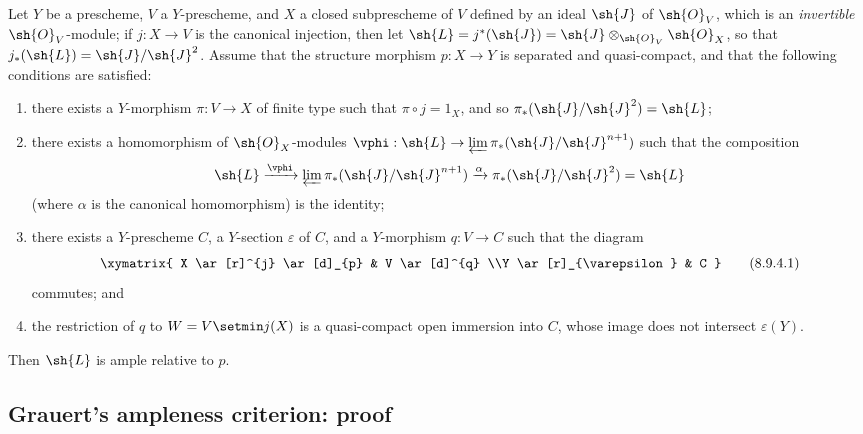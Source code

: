 \begin{proposition}[8.9.4]
\label{II.8.9.4}
Let $Y$ be a prescheme, $V$ a $Y$-prescheme, and $X$ a closed subprescheme of $V$ defined by an ideal $\sh{J}$ of $\sh{O}_V$, which is an \emph{invertible} $\sh{O}_V$-module;
if $j:X\to V$ is
the canonical injection, then let $\sh{L} = j^*(\sh{J}) = \sh{J}\otimes_{\sh{O}_V}\sh{O}_X$, so that $j_*(\sh{L})=\sh{J}/\sh{J}^2$.
Assume that the structure morphism $p:X\to Y$ is separated and quasi-compact, and that the following conditions are satisfied:
\begin{enumerate}
  \item[\rm{(i)}] there exists a $Y$-morphism $\pi:V\to X$ of finite type such that $\pi\circ j=1_X$, and so $\pi_*(\sh{J}/\sh{J}^2)=\sh{L}$;
  \item[\rm{(ii)}] there exists a homomorphism of $\sh{O}_X$-modules $\vphi:\sh{L}\to\varprojlim\pi_*(\sh{J}/\sh{J}^{n+1})$ such that the composition
    \[
      \sh{L}
      \xrightarrow{\vphi}
      \varprojlim \pi_*(\sh{J}/\sh{J}^{n+1})
      \xrightarrow{\alpha}
      \pi_*(\sh{J}/\sh{J}^2) = \sh{L}
    \]
    (where $\alpha$ is the canonical homomorphism) is the identity;
  \item[\rm{(iii)}] there exists a $Y$-prescheme $C$, a $Y$-section $\varepsilon$ of $C$, and a $Y$-morphism $q:V\to C$ such that the diagram
    \[
    \label{II.8.9.4.1}
      \xymatrix{
        X
          \ar[r]^{j}
          \ar[d]_{p}
      & V
          \ar[d]^{q}
      \\Y
          \ar[r]_{\varepsilon}
      & C
      }
    \tag{8.9.4.1}
    \]
    commutes; and
  \item[\rm{(iv)}] the restriction of $q$ to $W=V\setmin j(X)$ is a quasi-compact open immersion into $C$, whose image does not intersect $\varepsilon(Y)$.
\end{enumerate}
Then $\sh{L}$ is ample relative to $p$.
\end{proposition}


\subsection{Grauert's ampleness criterion: proof}
\label{subsection:II.8.10}

